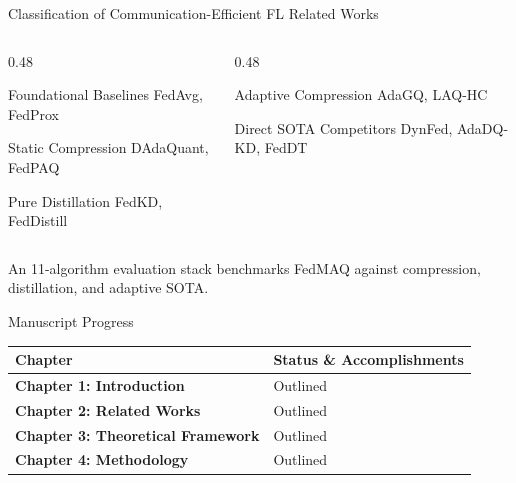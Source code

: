 \documentclass[11pt, aspectratio=169]{beamer}
\begin{document}
\begin{frame}{Classification of Communication-Efficient FL Related Works}
    \begin{columns}[T]
        \begin{column}{0.48\textwidth}
            \begin{block}{Foundational Baselines}
                \small FedAvg, FedProx
            \end{block}
            \vspace{0.2cm}
            \begin{block}{Static Compression}
                \small DAdaQuant, FedPAQ
            \end{block}
            \vspace{0.2cm}
            \begin{block}{Pure Distillation}
                \small FedKD, FedDistill
            \end{block}
        \end{column}
        \begin{column}{0.48\textwidth}
            \begin{block}{Adaptive Compression}
                \small AdaGQ, LAQ-HC
            \end{block}
            \vspace{0.2cm}
            \begin{block}{Direct SOTA Competitors}
                \small DynFed, AdaDQ-KD, FedDT
            \end{block}
        \end{column}
    \end{columns}
    \vfill
    \centering
    {\fontsize{8pt}{9.5pt}\selectfont An 11-algorithm evaluation stack benchmarks FedMAQ against compression, distillation, and adaptive SOTA.}
\end{frame}

\begin{frame}{Manuscript Progress}
    \centering
    \vfill
    \begin{table}
        \fontsize{8pt}{11pt}\selectfont
        \begin{tabular}{lp{8.0cm}}
            \toprule
            \textbf{Chapter}                          & \textbf{Status \& Accomplishments} \\
            \midrule
            \textbf{Chapter 1: Introduction}          & Outlined                           \\
            \textbf{Chapter 2: Related Works}         & Outlined                           \\
            \textbf{Chapter 3: Theoretical Framework} & Outlined                           \\
            \textbf{Chapter 4: Methodology}           & Outlined                           \\
            \bottomrule
        \end{tabular}
    \end{table}
    \vfill
\end{frame}
\end{document}
